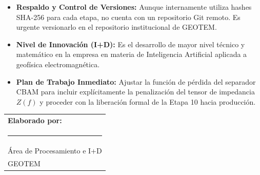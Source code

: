 \documentclass[11pt,letterpaper]{article}
\begin{document}
\vspace{0.8em}

\begin{tcolorbox}[
    colback=lightGray,
    colframe=borderGray,
    arc=1.5mm,
    boxrule=0.8pt,
    title=\textbf{\textcolor{geotemBlue}{Recomendaciones para el Checklist Institucional}},
    coltitle=geotemBlue
]
\begin{itemize}[leftmargin=1.2em, topsep=1pt, itemsep=2pt]
    \item \textbf{Respaldo y Control de Versiones:} Aunque internamente utiliza hashes SHA-256 para cada etapa, no cuenta con un repositorio Git remoto. Es urgente versionarlo en el repositorio institucional de GEOTEM.
    \item \textbf{Nivel de Innovación (I+D):} Es el desarrollo de mayor nivel técnico y matemático en la empresa en materia de Inteligencia Artificial aplicada a geofísica electromagnética.
    \item \textbf{Plan de Trabajo Inmediato:} Ajustar la función de pérdida del separador CBAM para incluir explícitamente la penalización del tensor de impedancia $Z(f)$ y proceder con la liberación formal de la Etapa 10 hacia producción.
\end{itemize}
\end{tcolorbox}

\vspace{1.5em}

\noindent
\begin{tabular}{p{7.5cm}}
    \textbf{Elaborado por:}\\[2.5em]
    \rule{7cm}{0.5pt}\\
    Área de Procesamiento e I+D\\
    GEOTEM
\end{tabular}
\end{document}
